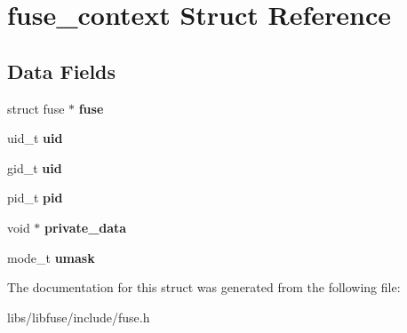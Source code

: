 \hypertarget{structfuse__context}{}\section{fuse\+\_\+context Struct Reference}
\label{structfuse__context}
\subsection*{Data Fields}
\begin{DoxyCompactItemize}
\item 
struct fuse $\ast$ {\bfseries fuse}\hypertarget{structfuse__context_a8872cbd7e8d0269fb5cbd1ed40e60a19}{}\label{structfuse__context_a8872cbd7e8d0269fb5cbd1ed40e60a19}

\item 
uid\+\_\+t {\bfseries uid}\hypertarget{structfuse__context_a3b71993170253c519e85736524201bf4}{}\label{structfuse__context_a3b71993170253c519e85736524201bf4}

\item 
gid\+\_\+t {\bfseries uid}\hypertarget{structfuse__context_a182089121cda205960fe1081e6b2141c}{}\label{structfuse__context_a182089121cda205960fe1081e6b2141c}

\item 
pid\+\_\+t {\bfseries pid}\hypertarget{structfuse__context_a79fb9aba1169e9a1cdbc6377ae1b3a6a}{}\label{structfuse__context_a79fb9aba1169e9a1cdbc6377ae1b3a6a}

\item 
void $\ast$ {\bfseries private\+\_\+data}\hypertarget{structfuse__context_a198911619cb8ee1a0b11302b94b6027e}{}\label{structfuse__context_a198911619cb8ee1a0b11302b94b6027e}

\item 
mode\+\_\+t {\bfseries umask}\hypertarget{structfuse__context_ac02329c0eacbd034fd0b44b1c0cb2c81}{}\label{structfuse__context_ac02329c0eacbd034fd0b44b1c0cb2c81}

\end{DoxyCompactItemize}


The documentation for this struct was generated from the following file\+:\begin{DoxyCompactItemize}
\item 
libs/libfuse/include/fuse.\+h\end{DoxyCompactItemize}
